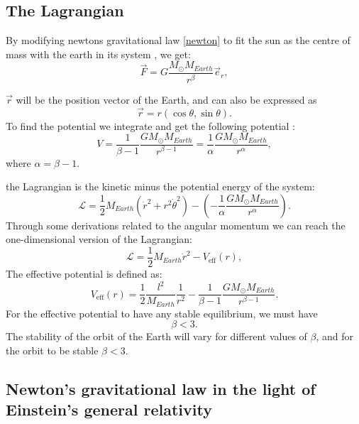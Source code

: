\documentclass{article}
\begin{document}
\subsection{The Lagrangian}\label{change_beta_section}

By modifying newtons  gravitational law \ref{newton}  to fit the sun as the centre of mass with the earth in its system , we get:
\begin{equation}\label{eq: beta_force}
\vec{F} = G\frac{M_\odot M_{Earth}}{r^\beta}\vec{e}_r,
\end{equation}

 $\vec{r}$ will be  the position vector of the Earth, and can also be expressed as \begin{equation}
\vec{r} = r(\cos\theta, \sin\theta).
\end{equation} To find the potential we integrate and get the following potential :
\begin{equation}
V = \frac{1}{\beta - 1}\frac{GM_\odot M_{Earth}}{r^{\beta - 1}} = \frac{1}{\alpha}\frac{GM_\odot M_{Earth}}{r^{\alpha}},
\end{equation}
where $\alpha = \beta -1$.

the Lagrangian is the  kinetic minus the potential energy of the system:
\begin{equation}
  \mathscr{L} = \frac{1}{2}M_{Earth}\left(\dot{r}^2 + r^2\dot{\theta}^2\right) - \left(-\frac{1}{\alpha}\frac{GM_\odot M_{Earth}}{r^\alpha}\right).
\end{equation}
Through some derivations related to the angular momentum we can reach the one-dimensional version of the Lagrangian:
\begin{equation}
  \mathscr{L} = \frac{1}{2}M_{Earth}\dot{r}^2 - V_{\mathrm{eff}}(r),
\end{equation}
The effective potential is defined as:
\begin{equation}\label{eq: effective_potential}
V_{\mathrm{eff}}(r) = \frac{1}{2}\frac{l^2}{M_{Earth}}\frac{1}{r^2} - \frac{1}{\beta - 1}\frac{GM_\odot M_{Earth}}{r^{\beta - 1}}.
\end{equation}
For the effective potential to have any stable equilibrium, we must have
\begin{equation}
\beta < 3.
\end{equation}
The stability of the orbit of the Earth will vary for different values of $\beta$, and for the orbit to be stable $\beta<3$.

\subsection{Newton's gravitational law in the light of Einstein's general relativity }\label{GR}
\end{document}

